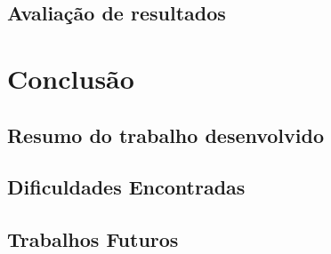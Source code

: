 \documentclass[ruledheader]{abnt} %
\begin{document}
\section{Avaliação de resultados}
\label{s_avaliacaoResultados} %



\chapter{Conclusão}
\label{c_conclusao}

\section{Resumo do trabalho desenvolvido}
\label{s_resumoDoTrabalho} %

\section{Dificuldades Encontradas}
\label{s_dificuldadeEncontradas} %

\section{Trabalhos Futuros}
\label{s_trabalhosFuturos} %



\nocite{*}



\end{document}
